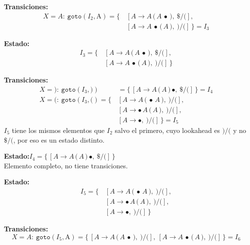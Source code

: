 \documentclass[12pt,letterpaper]{article}
\newcommand{\nt}[1]{\textit{#1}}
\newcommand{\tk}[1]{\texttt{#1}}
\newcommand{\tx}[1]{\text{#1}}
\begin{document}
\begin{enumerate}[label=\arabic*.]
  \textbf{Transiciones:}
  \[
  \begin{aligned}
    X=\nt{A}:\ \texttt{goto}(I_2,\tx{A}) = \{\, & [\nt{A}\to\nt{A}\,\tk{(}\,\nt{A}\,\bullet\,\tk{)},\ \tk{\$}/\tk{(}],\\
    & [\nt{A}\to\nt{A}\,\bullet\,\tk{(}\,\nt{A}\,\tk{)},\ \tk{)}/\tk{(}]\,\} = \boxed{I_3}
  \end{aligned}
  \]

  \medskip

  \textbf{Estado:}
  \[
  \begin{aligned}
    I_3 = \{\, & [\nt{A}\to\nt{A}\,\tk{(}\,\nt{A}\,\bullet\,\tk{)},\ \tk{\$}/\tk{(}],\\
               & [\nt{A}\to\nt{A}\,\bullet\,\tk{(}\,\nt{A}\,\tk{)},\ \tk{)}/\tk{(}]\,\}
  \end{aligned}
  \]

  \textbf{Transiciones:}
  \[
  \begin{aligned}
    X=\tk{)}:\ \texttt{goto}(I_3,\tk{)}) &= \{\,[\nt{A}\to\nt{A}\,\tk{(}\,\nt{A}\,\tk{)}\,\bullet,\ \tk{\$}/\tk{(}]\,\} = \boxed{I_4}\\[6pt]
    X=\tk{(}:\ \texttt{goto}(I_3,\tk{(}) = \{\, & [\nt{A}\to\nt{A}\,\tk{(}\,\bullet\,\nt{A}\,\tk{)},\ \tk{)}/\tk{(}],\\
    & [\nt{A}\to\bullet\,\nt{A}\,\tk{(}\,\nt{A}\,\tk{)},\ \tk{)}/\tk{(}],\\
    & [\nt{A}\to\bullet,\ \tk{)}/\tk{(}]\,\} = \boxed{I_5}
  \end{aligned}
  \]
  $I_5$ tiene los mismos elementos que $I_2$ salvo el primero, cuyo lookahead es $\tk{)}/\tk{(}$ y no
  $\tk{\$}/\tk{(}$, por eso es un estado distinto.

  \medskip

  \textbf{Estado:}\quad $I_4 = \{\,[\nt{A}\to\nt{A}\,\tk{(}\,\nt{A}\,\tk{)}\,\bullet,\ \tk{\$}/\tk{(}]\,\}$\\
  Elemento completo, no tiene transiciones.

  \medskip

  \textbf{Estado:}
  \[
  \begin{aligned}
    I_5 = \{\, & [\nt{A}\to\nt{A}\,\tk{(}\,\bullet\,\nt{A}\,\tk{)},\ \tk{)}/\tk{(}],\\
               & [\nt{A}\to\bullet\,\nt{A}\,\tk{(}\,\nt{A}\,\tk{)},\ \tk{)}/\tk{(}],\\
               & [\nt{A}\to\bullet,\ \tk{)}/\tk{(}]\,\}
  \end{aligned}
  \]

  \textbf{Transiciones:}
  \[
  X=\nt{A}:\ \texttt{goto}(I_5,\tx{A}) =\{\,[\nt{A}\to\nt{A}\,\tk{(}\,\nt{A}\,\bullet\,\tk{)},\ \tk{)}/\tk{(}],\
  [\nt{A}\to\nt{A}\,\bullet\,\tk{(}\,\nt{A}\,\tk{)},\ \tk{)}/\tk{(}]\,\} = \boxed{I_6}
  \]


\end{enumerate}
\end{document}
